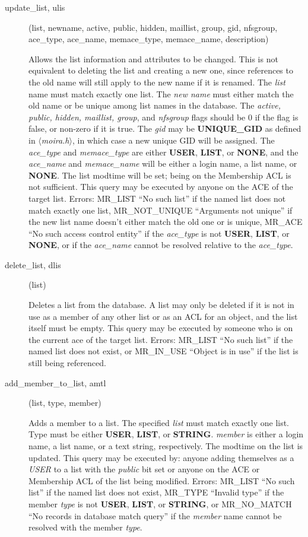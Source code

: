 \documentclass{article}
\begin{document}
\begin{description}
\item[update\_list, ulis](list, newname, active, public, hidden, maillist,
group, gid, nfsgroup, ace\_type, ace\_name, memace\_type, memace\_name,
description)

Allows the list information and attributes to be changed. This is not
equivalent to deleting the list and creating a new one, since references
to the old name will still apply to the new name if it is renamed. The
{\em list} name must match exactly one list. The {\em new name} must
either match the old name or be unique among list names in the
database. The {\em active, public, hidden, maillist, group}, and {\em
nfsgroup} flags should be 0 if the flag is false, or non-zero if it is
true. The {\em gid} may be {\bf UNIQUE\_GID} as defined in {\em
$\langle$moira.h$\rangle$}, in which case a new unique GID will be
assigned. The {\em ace\_type} and {\em memace\_type} are either {\bf
USER}, {\bf LIST}, or {\bf NONE}, and the {\em ace\_name} and {\em
memace\_name} will be either a login name, a list name, or {\bf
NONE}. The list modtime will be set; being on the Membership ACL is not
sufficient.  This query may be executed by anyone on the ACE of the
target list. Errors: MR\_LIST ``No such list'' if the named list does
not match exactly one list, MR\_NOT\_UNIQUE ``Arguments not unique'' if
the new list name doesn't either match the old one or is unique, MR\_ACE
``No such access control entity'' if the {\em ace\_type} is not {\bf
USER}, {\bf LIST}, or {\bf NONE}, or if the {\em ace\_name} cannot be
resolved relative to the {\em ace\_type}.

\item[delete\_list, dlis](list)

Deletes a list from the database.  A list may only be deleted if it is
not in use as a member of any other list or as an ACL for an object,
and the list itself must be empty.  This query may be executed by
someone who is on the current ace of the target list.  Errors:
MR\_LIST ``No such list'' if the named list does not exist, or
MR\_IN\_USE ``Object is in use'' if the list is still being referenced.

\item[add\_member\_to\_list, amtl](list, type, member)

Adds a member to a list.  The specified {\em list} must match exactly
one list.  Type must be either {\bf USER}, {\bf LIST}, or {\bf STRING}.
{\em member} is either a login name, a list name, or a text string,
respectively.  The modtime on the list is updated.  This query may be
executed by: anyone adding themselves as a {\em USER} to a list with the
{\em public} bit set or anyone on the ACE or Membership ACL of the list
being modified.  Errors: MR\_LIST ``No such list'' if the named list
does not exist, MR\_TYPE ``Invalid type'' if the member {\em type} is
not {\bf USER}, {\bf LIST}, or {\bf STRING}, or MR\_NO\_MATCH ``No
records in database match query'' if the {\em member} name cannot be
resolved with the member {\em type}.


\end{description}
\end{document}

